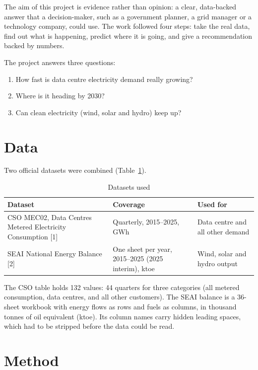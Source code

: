 \documentclass[10pt,twocolumn,a4paper]{article}
\begin{document}
The aim of this project is evidence rather than opinion: a clear, data-backed answer that a decision-maker, such as a government planner, a grid manager or a technology company, could use. The work followed four steps: take the real data, find out what is happening, predict where it is going, and give a recommendation backed by numbers.

The project answers three questions:
\begin{enumerate}
\item How fast is data centre electricity demand really growing?
\item Where is it heading by 2030?
\item Can clean electricity (wind, solar and hydro) keep up?
\end{enumerate}

\section{Data}

Two official datasets were combined (Table~\ref{tab:data}).

\begin{table}[h]
\centering
\caption{Datasets used}
\label{tab:data}
\footnotesize
\begin{tabular}{@{}>{\raggedright\arraybackslash}p{2.9cm}>{\raggedright\arraybackslash}p{2.1cm}>{\raggedright\arraybackslash}p{2.3cm}@{}}
\toprule
Dataset & Coverage & Used for \\
\midrule
CSO MEC02, Data Centres Metered Electricity Consumption [1] & Quarterly, 2015--2025, GWh & Data centre and all other demand \\
\addlinespace
SEAI National Energy Balance [2] & One sheet per year, 2015--2025 (2025 interim), ktoe & Wind, solar and hydro output \\
\bottomrule
\end{tabular}
\end{table}

The CSO table holds 132 values: 44 quarters for three categories (all metered consumption, data centres, and all other customers). The SEAI balance is a 36-sheet workbook with energy flows as rows and fuels as columns, in thousand tonnes of oil equivalent (ktoe). Its column names carry hidden leading spaces, which had to be stripped before the data could be read.

\section{Method}
\end{document}
